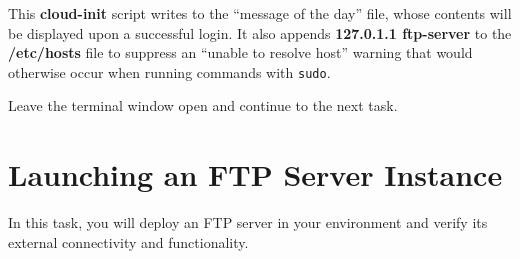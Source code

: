 \documentclass[letterpaper, 12pt]{article}
\begin{document}
\begin{enumerate}
    \begin{notebox}
        This \textbf{cloud-init} script writes to the ``message of the day'' file, whose contents will be displayed upon a successful login.
        It also appends \textbf{127.0.1.1 ftp-server} to the \textbf{/etc/hosts} file to suppress an ``unable to resolve host'' warning that would otherwise occur when running commands with \texttt{sudo}.
    \end{notebox}

    \begin{labstep}
        Leave the terminal window open and continue to the next task.
    \end{labstep}
\end{enumerate}

\section{Launching an FTP Server Instance}\label{sec:launch_an_ftp_server_instance}
In this task, you will deploy an FTP server in your environment and verify its external connectivity and functionality.
\end{document}

